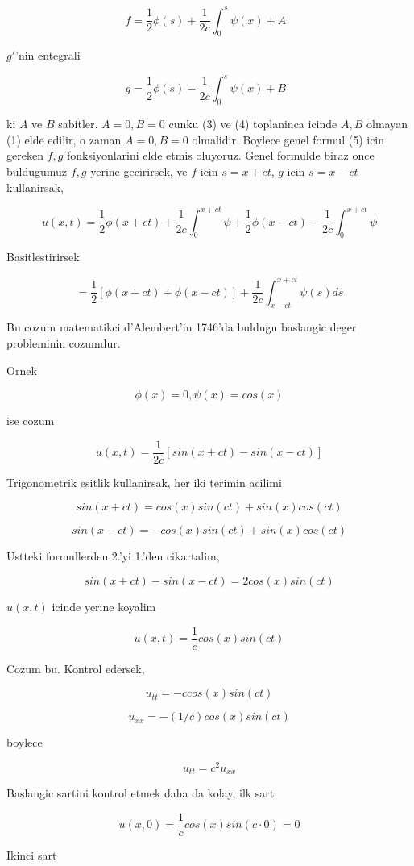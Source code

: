 \documentclass[12pt,fleqn]{article}\usepackage{../common}
\begin{document}
\[ f = \frac{1}{2}\phi(s) + \frac{1}{2c} \int_0^s \psi(x) + A 
\ \ \ \label{3}
\]

$g'$'nin entegrali

\[ g = \frac{1}{2}\phi(s) - \frac{1}{2c} \int_0^s \psi(x) + B
\ \ \ \label{4}
\]


ki $A$ ve $B$ sabitler. $A=0,B=0$ cunku (3) ve (4) toplaninca icinde $A,B$
olmayan (1) elde edilir, o zaman $A=0,B=0$ olmalidir. Boylece genel formul
(5) icin gereken $f,g$ fonksiyonlarini elde etmis oluyoruz. Genel formulde
biraz once buldugumuz $f,g$ yerine gecirirsek, ve $f$ icin $s = x+ct$, $g$
icin $s = x-ct$ kullanirsak,

\[ u(x,t) = 
\frac{1}{2}\phi(x+ct) + 
\frac{1}{2c} \int_0 ^{x+ct} \psi + 
\frac{1}{2}\phi(x-ct) -
\frac{1}{2c} \int_0 ^{x+ct} \psi 
 \]

Basitlestirirsek 

\[ = \frac{1}{2}[\phi(x+ct) + \phi(x-ct)] + 
\frac{1}{2c} \int_{x-ct} ^{x+ct} \psi (s) ds
 \]

Bu cozum matematikci d'Alembert'in 1746'da buldugu baslangic deger
probleminin cozumdur. 

Ornek

\[ \phi(x) = 0, \psi(x) = cos(x) \] 

ise cozum 

\[ u(x,t) = \frac{1}{2c}[sin(x+ct) - sin(x-ct)] \]

Trigonometrik esitlik kullanirsak, her iki terimin acilimi

\[ sin(x+ct) = cos(x)sin(ct) + sin(x)cos(ct) \]

\[ sin(x-ct) = -cos(x)sin(ct) + sin(x)cos(ct) \]

Ustteki formullerden 2.'yi 1.'den cikartalim, 

\[ sin(x+ct) - sin(x-ct) = 2cos(x)sin(ct) \]

$u(x,t)$ icinde yerine koyalim

\[ u(x,t) = \frac{1}{c}cos(x)sin(ct) \]

Cozum bu. Kontrol edersek, 

\[ u_{tt} = -c cos(x)sin(ct) \]

\[ u_{xx} = -(1/c)cos(x)sin(ct) \]

boylece 

\[ u_{tt} = c^2 u_{xx} \]

Baslangic sartini kontrol etmek daha da kolay, ilk sart

\[ u(x,0) = \frac{1}{c}cos(x)sin(c \cdot 0)  = 0\]

Ikinci sart
\end{document}
